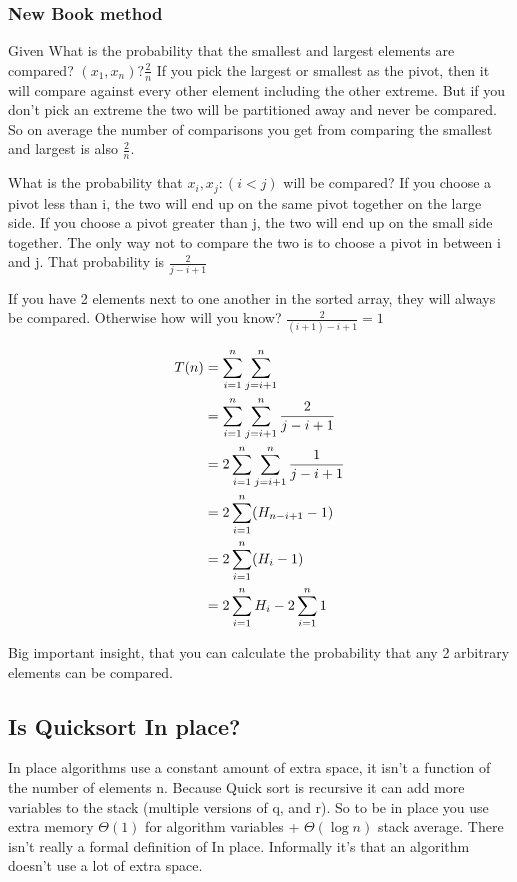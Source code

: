 \documentclass[english, 10pt]{article}
\begin{document}
\subsubsection{New Book method}

Given What is the probability that the smallest and largest elements are
compared? $(x_1,x_n)? \frac{2}{n}$ If you pick the largest or smallest as the
pivot, then it will compare against every other element including the other
extreme. But if you don't pick an extreme the two will be partitioned away and
never be compared. So on average the number of comparisons you get from
comparing the smallest and largest is also $\frac{2}{n}$.

What is the probability that $x_i, x_j : (i<j) $ will be compared? If you
choose a pivot less than i, the two will end up on the same pivot together on
the large side. If you choose a pivot greater than j, the two will end up on
the small side together. The only way not to compare the two is to choose a
pivot in between i and j. That probability is $\frac{2}{j-i+1}$

If you have 2 elements next to one another in the sorted array, they will
always be compared. Otherwise how will you know? $\frac{2}{(i+1)-i+1} = 1$




\begin{align*}
    T(n) &= \s{i=1}{n}\s{j=i+1}{n} \\ %
    &=\s{i=1}{n}\s{j=i+1}{n} \frac{2}{j-i+1} \\
    &=2 \s{i=1}{n} \s{j=i+1}{n} \frac{1}{j-i+1}\\
    &=2 \s{i=1}{n} (H_{n-i+1} -1) \\
    &=2 \s{i=1}{n} (H_{i} -1) \\
    &= 2\s{i=1}{n} H_i - 2\s{i=1}{n} 1 \\
\end{align*}

Big important insight, that you can calculate the probability that any 2  arbitrary elements can be compared.

\subsection{Is Quicksort In place?}

In place algorithms use a constant amount of extra space, it isn't a function
of the number of elements n.  Because Quick sort is recursive it can add more
variables to the stack (multiple versions of q, and r).  So to be in place you
use extra memory $\Theta(1)$ for algorithm variables + $\Theta(\log n)$ stack
average.  There isn't really a formal definition of In place.  Informally it's
that an algorithm doesn't use a lot of extra space.
\end{document}
